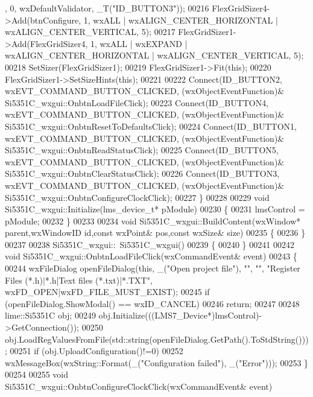 \begin{DoxyCode}
      , 0, wxDefaultValidator, \_T(\textcolor{stringliteral}{"ID\_BUTTON3"}));
00216     FlexGridSizer4->Add(btnConfigure, 1, wxALL | wxALIGN\_CENTER\_HORIZONTAL | wxALIGN\_CENTER\_VERTICAL, 5);
00217     FlexGridSizer1->Add(FlexGridSizer4, 1, wxALL | wxEXPAND | wxALIGN\_CENTER\_HORIZONTAL | 
      wxALIGN\_CENTER\_VERTICAL, 5);
00218     SetSizer(FlexGridSizer1);
00219     FlexGridSizer1->Fit(\textcolor{keyword}{this});
00220     FlexGridSizer1->SetSizeHints(\textcolor{keyword}{this});
00221 
00222     Connect(ID\_BUTTON2, wxEVT\_COMMAND\_BUTTON\_CLICKED, (wxObjectEventFunction)&
      Si5351C_wxgui::OnbtnLoadFileClick);
00223     Connect(ID\_BUTTON4, wxEVT\_COMMAND\_BUTTON\_CLICKED, (wxObjectEventFunction)&
      Si5351C_wxgui::OnbtnResetToDefaultsClick);
00224     Connect(ID\_BUTTON1, wxEVT\_COMMAND\_BUTTON\_CLICKED, (wxObjectEventFunction)&
      Si5351C_wxgui::OnbtnReadStatusClick);
00225     Connect(ID\_BUTTON5, wxEVT\_COMMAND\_BUTTON\_CLICKED, (wxObjectEventFunction)&
      Si5351C_wxgui::OnbtnClearStatusClick);
00226     Connect(ID\_BUTTON3, wxEVT\_COMMAND\_BUTTON\_CLICKED, (wxObjectEventFunction)&
      Si5351C_wxgui::OnbtnConfigureClockClick);
00227 \}
00228 
00229 \textcolor{keywordtype}{void} Si5351C_wxgui::Initialize(lms_device_t* pModule)
00230 \{
00231     lmsControl = pModule;
00232 \}
00233 
00234 \textcolor{keywordtype}{void} Si5351C_wxgui::BuildContent(wxWindow* parent,wxWindowID \textcolor{keywordtype}{id},\textcolor{keyword}{const} wxPoint& pos,\textcolor{keyword}{const} wxSize& 
      size)
00235 \{
00236 \}
00237 
00238 Si5351C_wxgui::~Si5351C_wxgui()
00239 \{
00240 \}
00241 
00242 \textcolor{keywordtype}{void} Si5351C_wxgui::OnbtnLoadFileClick(wxCommandEvent& event)
00243 \{
00244    wxFileDialog openFileDialog(\textcolor{keyword}{this}, \_(\textcolor{stringliteral}{"Open project file"}), \textcolor{stringliteral}{""}, \textcolor{stringliteral}{""}, \textcolor{stringliteral}{"Register Files (*.h)|*.h|Text files
       (*.txt)|*.TXT"}, wxFD\_OPEN|wxFD\_FILE\_MUST\_EXIST);
00245     \textcolor{keywordflow}{if} (openFileDialog.ShowModal() == wxID\_CANCEL)
00246         \textcolor{keywordflow}{return};
00247 
00248     lime::Si5351C obj;
00249     obj.Initialize(((LMS7_Device*)lmsControl)->GetConnection());
00250     obj.LoadRegValuesFromFile(std::string(openFileDialog.GetPath().ToStdString()));
00251     \textcolor{keywordflow}{if} (obj.UploadConfiguration()!=0)
00252         wxMessageBox(wxString::Format(\_(\textcolor{stringliteral}{"Configuration failed"}), \_(\textcolor{stringliteral}{"Error"})));
00253 \}
00254 
00255 \textcolor{keywordtype}{void} Si5351C_wxgui::OnbtnConfigureClockClick(wxCommandEvent& event)

\end{DoxyCode}
